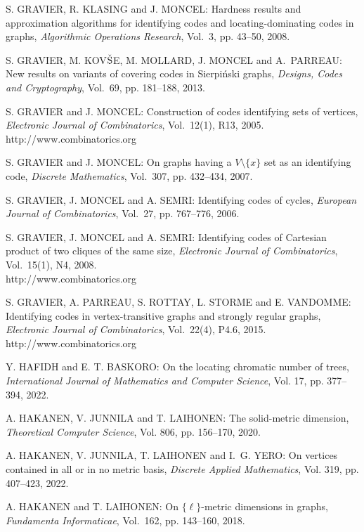 \begin{thebibliography}{999}
S. GRAVIER, R. KLASING and J. MONCEL: Hardness results and approximation algorithms for identifying codes and locating-dominating codes in graphs, {\it Algorithmic Operations Research}, Vol.~3, pp. 43--50, 2008.

S. GRAVIER, M. KOV$\check{\rm S}$E, M. MOLLARD, J. MONCEL and A.~PARREAU: New results on variants of covering codes in Sierpi\'nski graphs, {\it Designs, Codes and Cryptography}, Vol.~69, pp. 181--188, 2013.

S. GRAVIER and J. MONCEL: Construction of codes identifying sets of vertices, {\it Electronic Journal of Combinatorics}, Vol.~12(1), R13, 2005.\\
http://www.combinatorics.org

S. GRAVIER and J. MONCEL: On graphs having a $V \setminus \{ x \}$ set as an identifying code, {\it Discrete Mathematics}, Vol.~307, pp. 432--434, 2007.

S. GRAVIER, J. MONCEL and A. SEMRI: Identifying codes of cycles, {\it European Journal of Combinatorics}, Vol.~27, pp. 767--776, 2006.

S. GRAVIER, J. MONCEL and A. SEMRI: Identifying codes of Cartesian product of two cliques of the same size, {\it Electronic Journal of Combinatorics}, Vol.~15(1), N4, 2008.\\
http://www.combinatorics.org

S. GRAVIER, A. PARREAU, S. ROTTAY, L. STORME and E. VANDOMME: Identifying codes in vertex-transitive graphs and strongly regular graphs, {\it Electronic Journal of Combinatorics}, Vol.~22(4), P4.6, 2015.\\
http://www.combinatorics.org

Y. HAFIDH and E. T. BASKORO: On the locating chromatic number of trees, {\it  International Journal of Mathematics and Computer Science}, Vol. 17, pp. 377--394, 2022.

A. HAKANEN, V. JUNNILA and T. LAIHONEN: The solid-metric dimension, {\it Theoretical Computer Science}, Vol. 806, pp. 156--170, 2020.

A. HAKANEN, V. JUNNILA, T. LAIHONEN and I.~G. YERO: On vertices contained in all or in no metric basis, {\it Discrete Applied Mathematics}, Vol. 319, pp. 407--423, 2022.

A. HAKANEN and T. LAIHONEN: On $\{\ell\}$-metric dimensions in graphs, {\it Fundamenta Informaticae}, Vol.~162, pp. 143--160, 2018.


\end{thebibliography}
